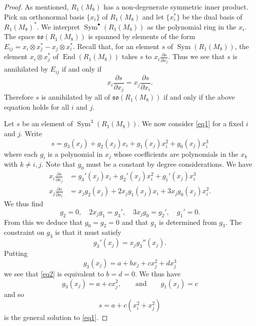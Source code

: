\documentclass{amsart}
\theoremstyle{definition}
\theoremstyle{remark}
\DeclareMathOperator{\Sym}{Sym}
\DeclareMathOperator{\End}{End}
\let\mf\mathfrak
\begin{document}
\begin{proof}
As mentioned, $R_1(M_8)$ has a non-degenerate symmetric inner product.  Pick an orthonormal basis $\{x_i\}$ of
$R_1(M_8)$ and let $\{x_i^*\}$ be the dual basis of $R_1(M_8)^*$.  We interpret $\Sym^{\bullet}(R_1(M_8))$ as the
polynomial ring in the $x_i$.  The space $\mf{so}(R_1(M_8))$ is spanned by elements of the form $E_{ij}=x_i \otimes
x_j^* - x_j \otimes x_i^*$.  Recall that, for an element $s$ of $\Sym(R_1(M_8))$, the element $x_i \otimes x_j^*$ of
$\End(R_1(M_8))$ takes $s$ to $x_i \frac {\partial s}{\partial x_j}$.  Thus we see that $s$ is annihilated by $E_{ij}$
if and only if 
\begin{equation}
\label{eq1}
x_i \frac {\partial s} {\partial x_j} = x_j \frac {\partial s} {\partial x_i} .
\end{equation}
Therefore $s$ is annihilated by all of $\mf{so}(R_1(M_8))$ if and only if the above equation holds for all $i$ and $j$.

Let $s$ be an element of $\Sym^3(R_1(M_8))$.  We now consider \eqref{eq1} for a fixed $i$ and $j$.  Write
\begin{displaymath}
s=g_3(x_j)+g_2(x_j) x_i+g_1(x_j) x_i^2+g_0(x_j) x_i^3
\end{displaymath}
where each $g_i$ is a polynomial in $x_j$ whose coefficients are polynomials in the $x_k$ with $k \ne i, j$.  Note that
$g_0$ must be a constant by degree considerations.  We have
\begin{displaymath}
\begin{split}
x_i \frac {\partial s} {\partial x_j} &=  g_3'(x_j) x_i + g_2'(x_j) x_i^2 + g_1'(x_j) x_i^3 \\
x_j \frac { \partial s} {\partial x_i} &= x_j g_2(x_j)+2 x_j g_1(x_j) x_i+3 x_j g_0(x_j) x_i^2.
\end{split}
\end{displaymath}
We thus find
\begin{displaymath}
g_2=0, \quad 2x_j g_1=g_3', \quad 3 x_j g_0=g_2', \quad g_1'=0.
\end{displaymath}
{}From this we deduce that $g_0=g_2=0$ and that $g_1$ is determined from $g_3$.  The constraint on $g_3$ is that it
must satisfy
\begin{equation}
\label{eq2}
g_3'(x_j)=x_j g_3''(x_j).
\end{equation}
Putting
\begin{displaymath}
g_3(x_j)=a+b x_j+c x_j^2+d x_j^3
\end{displaymath}
we see that \eqref{eq2} is equivalent to $b=d=0$.  We thus have
\begin{displaymath}
g_3(x_j)=a+c x_j^2, \qquad \textrm{and} \qquad g_1(x_j)=c
\end{displaymath}
and so
\begin{displaymath}
s = a + c (x_i^2+ x_j^2)
\end{displaymath}
is the general solution to \eqref{eq1}.


\end{proof}
\end{document}
